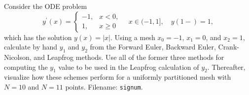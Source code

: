 \documentclass[graybox,sectrefs,envcountresetchap,open=right,final]{svmonodo}
\makeatletter
\newenvironment{doconceexercise}{}{}
\newcounter{doconceexercisecounter}%
\newcommand\listofexercises{
\chapter*{List of Exercises, Problems, and Projects
          \@mkboth{List of Exercises, Problems, and Projects}{List of Exercises, Problems, and Projects}}
\markboth{List of Exercises, Problems, and Projects}{List of Exercises, Problems, and Projects}
\@starttoc{loe}
}
\makeatother
\begin{document}
\begin{doconceexercise}

                
\label{decay:app:exer:signum}

Consider the ODE problem
\[
y^{\prime}(x) = \left\lbrace\begin{array}{ll}
-1, & x < 0,\\ 
1, & x \geq 0
\end{array}\right.\quad x\in (-1, 1],
\quad y(1-)=1,
\]
which has the solution $y(x)=|x|$.
Using a mesh $x_0=-1$, $x_1=0$, and $x_2=1$, calculate by hand
$y_1$ and $y_2$ from the Forward Euler, Backward Euler, Crank-Nicolson,
and Leapfrog methods. Use all of the former three methods for computing
the $y_1$ value to be used in the Leapfrog calculation of $y_2$.
Thereafter, visualize how these schemes perform for a uniformly partitioned
mesh with $N=10$ and $N=11$ points.
\noindent Filename: \texttt{signum}.

\end{doconceexercise}
\end{document}
